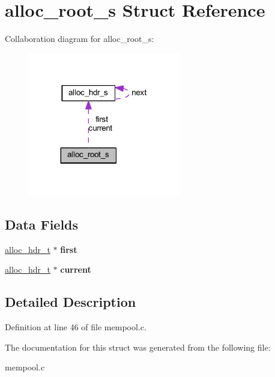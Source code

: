 \hypertarget{structalloc__root__s}{}\section{alloc\+\_\+root\+\_\+s Struct Reference}
\label{structalloc__root__s}


Collaboration diagram for alloc\+\_\+root\+\_\+s\+:
\nopagebreak
\begin{figure}[H]
\begin{center}
\leavevmode
\includegraphics[width=188pt]{d4/d08/structalloc__root__s__coll__graph}
\end{center}
\end{figure}
\subsection*{Data Fields}
\begin{DoxyCompactItemize}
\item 
\mbox{\label{structalloc__root__s_aaea7084f01728999156d7ec363ac51c1}} 
\hyperlink{structalloc__hdr__s}{alloc\+\_\+hdr\+\_\+t} $\ast$ {\bfseries first}
\item 
\mbox{\label{structalloc__root__s_a03962c33818e443ec17447ef9718952e}} 
\hyperlink{structalloc__hdr__s}{alloc\+\_\+hdr\+\_\+t} $\ast$ {\bfseries current}
\end{DoxyCompactItemize}


\subsection{Detailed Description}


Definition at line 46 of file mempool.\+c.



The documentation for this struct was generated from the following file\+:\begin{DoxyCompactItemize}
\item 
mempool.\+c\end{DoxyCompactItemize}
